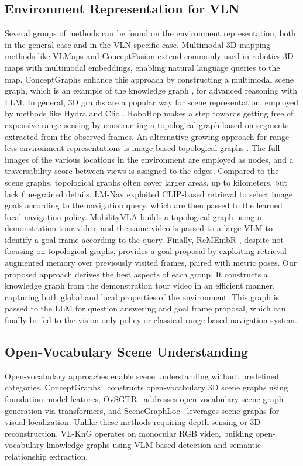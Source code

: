 \subsection{Environment Representation for VLN}
Several groups of methods can be found on the environment representation, both in the general case and in the VLN-specific case. Multimodal 3D-mapping methods like VLMaps \cite{huang2022visual} and ConceptFusion \cite{jatavallabhulaconceptfusion} extend commonly used in robotics 3D maps with multimodal embeddings, enabling natural language queries to the map. ConceptGraphs \cite{gu2024conceptgraphs} enhance this approach by constructing a multimodal scene graph, which is an example of the knowledge graph \cite{yudin2025m3dmap}, for advanced reasoning with LLM. In general, 3D graphs \cite{armeni20193d} are a popular way for scene representation, employed by methods like Hydra \cite{hughes2022hydra} and Clio \cite{maggio2024clio}. RoboHop \cite{garg2024robohop} makes a step towards getting free of expensive range sensing by constructing a topological graph based on segments extracted from the observed frames.
An alternative growing approach for range-less environment representations is image-based topological graphs \cite{shah2021ving}. The full images of the various locations in the environment are employed as nodes, and a traversability score between views is assigned to the edges. Compared to the scene graphs, topological graphs often cover larger areas, up to kilometers, but lack fine-grained details. LM-Nav \cite{shah2023lm} exploited CLIP-based retrieval to select image goals according to the navigation query, which are then passed to the learned local navigation policy. MobilityVLA \cite{chiang2024mobility} builds a topological graph using a demonstration tour video, and the same video is passed to a large VLM to identify a goal frame according to the query. Finally, ReMEmbR \cite{anwar2024remembr}, despite not focusing on topological graphs, provides a goal proposal by exploiting retrieval-augmented memory over previously visited frames, paired with metric poses.
Our proposed approach derives the best aspects of each group. It constructs a knowledge graph from the demonstration tour video in an efficient manner, capturing both global and local properties of the environment. This graph is passed to the LLM for question answering and goal frame proposal, which can finally be fed to the vision-only policy or classical range-based navigation system.

\subsection{Open-Vocabulary Scene Understanding}
Open-vocabulary approaches enable scene understanding without predefined categories.
ConceptGraphs~\cite{gu2024conceptgraphs} constructs open-vocabulary 3D scene graphs using foundation model features, OvSGTR~\cite{ovsgtr2024eccv} addresses open-vocabulary scene graph generation via transformers, and SceneGraphLoc~\cite{scenegraphloc2024eccv} leverages scene graphs for visual localization.
Unlike these methods requiring depth sensing or 3D reconstruction, VL-KnG operates on monocular RGB video, building open-vocabulary knowledge graphs using VLM-based detection and semantic relationship extraction.

